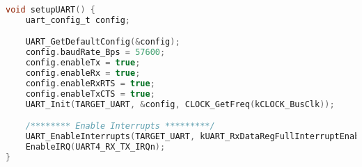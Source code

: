 \begin{lstlisting}[language=c,caption=Problem 3 setupUART, label=list:p3_setupuart]
void setupUART() {
    uart_config_t config;

    UART_GetDefaultConfig(&config);
    config.baudRate_Bps = 57600;
    config.enableTx = true;
    config.enableRx = true;
    config.enableRxRTS = true;
    config.enableTxCTS = true;
    UART_Init(TARGET_UART, &config, CLOCK_GetFreq(kCLOCK_BusClk));

    /******** Enable Interrupts *********/
    UART_EnableInterrupts(TARGET_UART, kUART_RxDataRegFullInterruptEnable);
    EnableIRQ(UART4_RX_TX_IRQn);
}
\end{lstlisting}